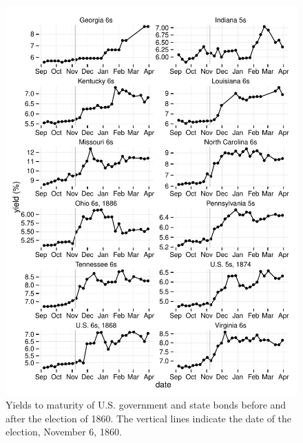 \documentclass[11pt, oneside, article]{memoir}\usepackage[]{graphicx}\usepackage[]{color}
\begin{document}
\begin{figure}
  \centerfloat
  \includegraphics{figures/fig_yields_election-1}
\caption{Yields to maturity of U.S. government and state bonds before and after the election of 1860.
  The vertical lines indicate the date of the election, November 6, 1860.}
\label{fig:yields_election}
\end{figure}
\end{document}
